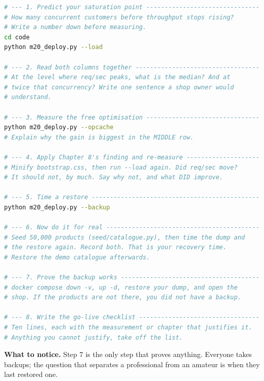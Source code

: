 \begin{lab}
\begin{lstlisting}[language=bash]
# --- 1. Predict your saturation point -------------------------------
# How many concurrent customers before throughput stops rising?
# Write a number down before measuring.
cd code
python m20_deploy.py --load

# --- 2. Read both columns together ----------------------------------
# At the level where req/sec peaks, what is the median? And at
# twice that concurrency? Write one sentence a shop owner would
# understand.

# --- 3. Measure the free optimisation -------------------------------
python m20_deploy.py --opcache
# Explain why the gain is biggest in the MIDDLE row.

# --- 4. Apply Chapter 8's finding and re-measure --------------------
# Minify bootstrap.css, then run --load again. Did req/sec move?
# It should not, by much. Say why not, and what DID improve.

# --- 5. Time a restore ----------------------------------------------
python m20_deploy.py --backup

# --- 6. Now do it for real ------------------------------------------
# Seed 50,000 products (seed/catalogue.py), then time the dump and
# the restore again. Record both. That is your recovery time.
# Restore the demo catalogue afterwards.

# --- 7. Prove the backup works --------------------------------------
# docker compose down -v, up -d, restore your dump, and open the
# shop. If the products are not there, you did not have a backup.

# --- 8. Write the go-live checklist ---------------------------------
# Ten lines, each with the measurement or chapter that justifies it.
# Anything you cannot justify, take off the list.
\end{lstlisting}

\smallskip
\textbf{What to notice.} Step 7 is the only step that proves anything. Everyone
takes backups; the question that separates a professional from an amateur is
when they last restored one.
\end{lab}

